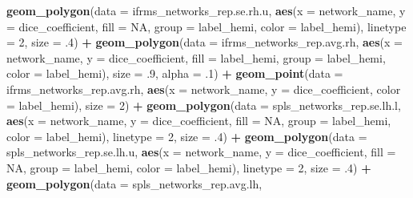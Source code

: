 \documentclass[
]{article}
\newenvironment{Shaded}{\begin{snugshade}}{\end{snugshade}}
\newcommand{\DataTypeTok}[1]{\textcolor[rgb]{0.13,0.29,0.53}{#1}}
\newcommand{\DecValTok}[1]{\textcolor[rgb]{0.00,0.00,0.81}{#1}}
\newcommand{\FloatTok}[1]{\textcolor[rgb]{0.00,0.00,0.81}{#1}}
\newcommand{\KeywordTok}[1]{\textcolor[rgb]{0.13,0.29,0.53}{\textbf{#1}}}
\newcommand{\NormalTok}[1]{#1}
\newcommand{\OperatorTok}[1]{\textcolor[rgb]{0.81,0.36,0.00}{\textbf{#1}}}
\newcommand{\OtherTok}[1]{\textcolor[rgb]{0.56,0.35,0.01}{#1}}
\newcommand{\StringTok}[1]{\textcolor[rgb]{0.31,0.60,0.02}{#1}}
\begin{document}
\begin{Shaded}
\begin{Highlighting}[]
{{{{{{{{{{{{\StringTok{  }\KeywordTok{geom_polygon}\NormalTok{(}\DataTypeTok{data =}\NormalTok{ ifrms_networks_rep.se.rh.u, }
               \KeywordTok{aes}\NormalTok{(}\DataTypeTok{x =}\NormalTok{ network_name, }\DataTypeTok{y =}\NormalTok{ dice_coefficient, }\DataTypeTok{fill =} \OtherTok{NA}\NormalTok{, }\DataTypeTok{group =}\NormalTok{ label_hemi, }\DataTypeTok{color =}\NormalTok{ label_hemi), }
               \DataTypeTok{linetype =} \DecValTok{2}\NormalTok{, }\DataTypeTok{size =} \FloatTok{.4}\NormalTok{) }\OperatorTok{+}\StringTok{ }
\StringTok{  }\KeywordTok{geom_polygon}\NormalTok{(}\DataTypeTok{data =}\NormalTok{ ifrms_networks_rep.avg.rh, }
               \KeywordTok{aes}\NormalTok{(}\DataTypeTok{x =}\NormalTok{ network_name, }\DataTypeTok{y =}\NormalTok{ dice_coefficient, }\DataTypeTok{fill =}\NormalTok{ label_hemi, }\DataTypeTok{group =}\NormalTok{ label_hemi, }
                   \DataTypeTok{color =}\NormalTok{ label_hemi), }
               \DataTypeTok{size =} \FloatTok{.9}\NormalTok{, }\DataTypeTok{alpha =} \FloatTok{.1}\NormalTok{) }\OperatorTok{+}
\StringTok{  }\KeywordTok{geom_point}\NormalTok{(}\DataTypeTok{data =}\NormalTok{ ifrms_networks_rep.avg.rh, }
             \KeywordTok{aes}\NormalTok{(}\DataTypeTok{x =}\NormalTok{ network_name, }\DataTypeTok{y =}\NormalTok{ dice_coefficient, }\DataTypeTok{color =}\NormalTok{ label_hemi), }
             \DataTypeTok{size =} \DecValTok{2}\NormalTok{) }\OperatorTok{+}
\StringTok{  }
\StringTok{  }
\StringTok{  }\KeywordTok{geom_polygon}\NormalTok{(}\DataTypeTok{data =}\NormalTok{ spls_networks_rep.se.lh.l, }
               \KeywordTok{aes}\NormalTok{(}\DataTypeTok{x =}\NormalTok{ network_name, }\DataTypeTok{y =}\NormalTok{ dice_coefficient, }\DataTypeTok{fill =} \OtherTok{NA}\NormalTok{, }\DataTypeTok{group =}\NormalTok{ label_hemi, }\DataTypeTok{color =}\NormalTok{ label_hemi), }
               \DataTypeTok{linetype =} \DecValTok{2}\NormalTok{, }\DataTypeTok{size =} \FloatTok{.4}\NormalTok{) }\OperatorTok{+}\StringTok{ }
\StringTok{  }\KeywordTok{geom_polygon}\NormalTok{(}\DataTypeTok{data =}\NormalTok{ spls_networks_rep.se.lh.u, }
               \KeywordTok{aes}\NormalTok{(}\DataTypeTok{x =}\NormalTok{ network_name, }\DataTypeTok{y =}\NormalTok{ dice_coefficient, }\DataTypeTok{fill =} \OtherTok{NA}\NormalTok{, }\DataTypeTok{group =}\NormalTok{ label_hemi, }\DataTypeTok{color =}\NormalTok{ label_hemi), }
               \DataTypeTok{linetype =} \DecValTok{2}\NormalTok{, }\DataTypeTok{size =} \FloatTok{.4}\NormalTok{) }\OperatorTok{+}\StringTok{ }
\StringTok{  }\KeywordTok{geom_polygon}\NormalTok{(}\DataTypeTok{data =}\NormalTok{ spls_networks_rep.avg.lh, }
}}}}}}}}}}}}
\end{Highlighting}
\end{Shaded}
\end{document}
